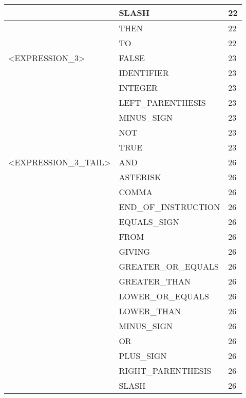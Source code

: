 \begin{longtable}{|l|l|l|}
                     &   SLASH                &   22 \\ \hline
                     &   THEN                 &   22 \\ \hline
                     &   TO                   &   22 \\ \hline
<EXPRESSION\_3>      &   FALSE                &   23 \\ \hline
                     &   IDENTIFIER           &   23 \\ \hline
                     &   INTEGER              &   23 \\ \hline
                     &   LEFT\_PARENTHESIS     &   23 \\ \hline
                     &   MINUS\_SIGN           &   23 \\ \hline
                     &   NOT                  &   23 \\ \hline
                     &   TRUE                 &   23 \\ \hline
<EXPRESSION\_3\_TAIL>&   AND                  &   26 \\ \hline
                     &   ASTERISK             &   26 \\ \hline
                     &   COMMA                &   26 \\ \hline
                     &   END\_OF\_INSTRUCTION   &   26 \\ \hline
                     &   EQUALS\_SIGN          &   26 \\ \hline
                     &   FROM                 &   26 \\ \hline
                     &   GIVING               &   26 \\ \hline
                     &   GREATER\_OR\_EQUALS    &   26 \\ \hline
                     &   GREATER\_THAN         &   26 \\ \hline
                     &   LOWER\_OR\_EQUALS      &   26 \\ \hline
                     &   LOWER\_THAN           &   26 \\ \hline
                     &   MINUS\_SIGN           &   26 \\ \hline
                     &   OR                   &   26 \\ \hline
                     &   PLUS\_SIGN            &   26 \\ \hline
                     &   RIGHT\_PARENTHESIS    &   26 \\ \hline
                     &   SLASH                &   26 \\ \hline

\end{longtable}
